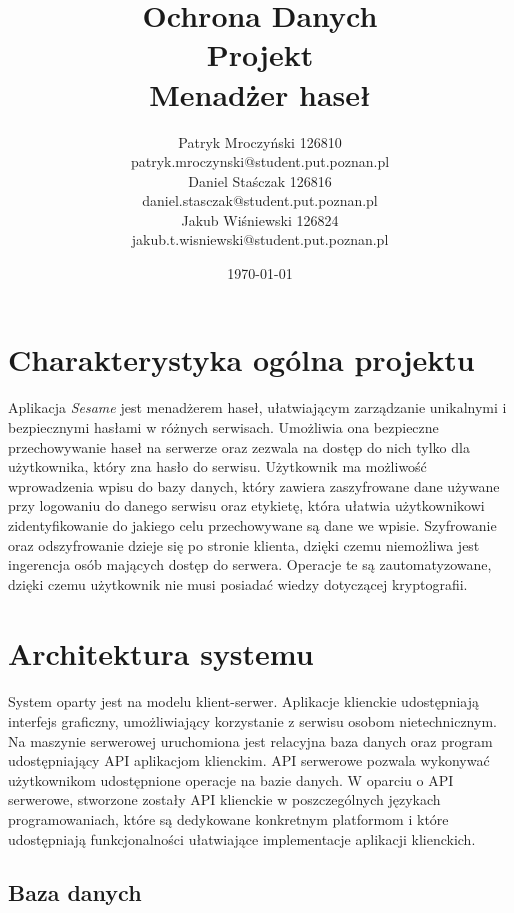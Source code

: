 \documentclass{article}
\title{
    Ochrona Danych
    \\
    [0.2em]\smaller{}
    Projekt
    \\
    Menadżer haseł \insertprojectname}
\author{
    Patryk Mroczyński 126810
    \\
    patryk.mroczynski@student.put.poznan.pl
    \\
    Daniel Staśczak 126816
    \\
    daniel.stasczak@student.put.poznan.pl
    \\
    Jakub Wiśniewski 126824
    \\
    jakub.t.wisniewski@student.put.poznan.pl
}
\date{\today}
\newcommand{\insertprojectname}{\textit{Sesame }}
\begin{document}
    \maketitle

    \newpage
    \tableofcontents
    \listoffigures

    \newpage

    \section{Charakterystyka ogólna projektu}
    \paragraph{}Aplikacja \insertprojectname jest menadżerem haseł, ułatwiającym zarządzanie unikalnymi i bezpiecznymi hasłami w różnych serwisach. Umożliwia ona bezpieczne przechowywanie haseł na serwerze oraz zezwala na dostęp do nich tylko dla użytkownika, który zna hasło do serwisu. Użytkownik ma możliwość wprowadzenia wpisu do bazy danych, który zawiera zaszyfrowane dane używane przy logowaniu do danego serwisu oraz etykietę, która ułatwia użytkownikowi zidentyfikowanie do jakiego celu przechowywane są dane we wpisie. Szyfrowanie oraz odszyfrowanie dzieje się po stronie klienta, dzięki czemu niemożliwa jest ingerencja osób mających dostęp do serwera. Operacje te są zautomatyzowane, dzięki czemu użytkownik nie musi posiadać wiedzy dotyczącej kryptografii.

    \section{Architektura systemu}
    \paragraph{}System oparty jest na modelu klient-serwer. Aplikacje klienckie udostępniają interfejs graficzny, umożliwiający korzystanie z serwisu osobom nietechnicznym. Na maszynie serwerowej uruchomiona jest relacyjna baza danych oraz program udostępniający API aplikacjom klienckim. API serwerowe pozwala wykonywać użytkownikom udostępnione operacje na bazie danych. W oparciu o API serwerowe, stworzone zostały API klienckie w poszczególnych językach programowaniach, które są dedykowane konkretnym platformom i które udostępniają funkcjonalności ułatwiające implementacje aplikacji klienckich.

    \subsection{Baza danych}
\end{document}
